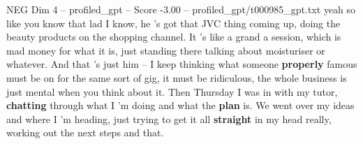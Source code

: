 \begin{textsample}{NEG Dim 4 – profiled\_gpt – Score -3.00 – profiled\_gpt/t000985\_gpt.txt}  \label{ex:f4_neg_009}
yeah so like you know that lad I know, he ’s got that JVC thing coming up, doing the beauty products on the shopping channel.
It ’s like a grand a session, which is mad money for what it is, just standing there talking about moisturiser or whatever.
And that ’s just him – I keep thinking what someone \textbf{properly} famous must be on for the same sort of gig, it must be ridiculous, the whole business is just mental when you think about it.
Then Thursday I was in with my tutor, \textbf{chatting} through what I ’m doing and what the \textbf{plan} is.
We went over my ideas and where I ’m heading, just trying to get it all \textbf{straight} in my head really, working out the next steps and that.

\end{textsample}
